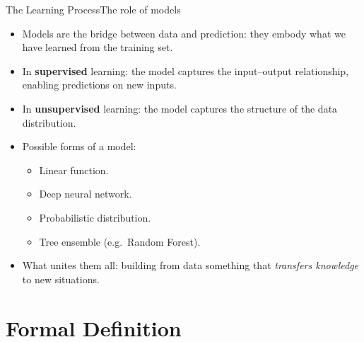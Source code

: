\begin{frame}{The Learning Process}{The role of models}
  \begin{itemize}
    \item Models are the bridge between data and prediction: they embody what we have
          learned from the training set.
    \item In \textbf{supervised} learning: the model captures the input–output relationship,
          enabling predictions on new inputs.
    \item In \textbf{unsupervised} learning: the model captures the structure of the data
          distribution.
    \item Possible forms of a model:
      \begin{itemize}
        \item Linear function.
        \item Deep neural network.
        \item Probabilistic distribution.
        \item Tree ensemble (e.g.\ Random Forest).
      \end{itemize}
    \item What unites them all: building from data something that \emph{transfers knowledge}
          to new situations.
  \end{itemize}
\end{frame}

\section{Formal Definition}

